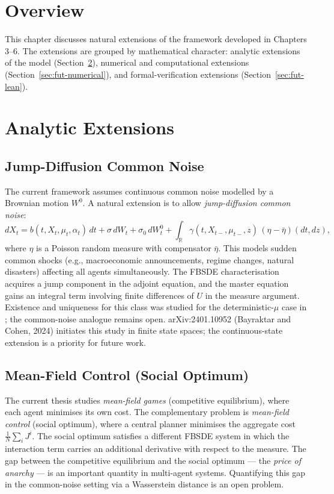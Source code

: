 
\section{Overview}

This chapter discusses natural extensions of the framework developed in
Chapters 3--6. The extensions are grouped by mathematical character:
analytic extensions of the model (Section~\ref{sec:fut-analytic}),
numerical and computational extensions (Section~\ref{sec:fut-numerical}),
and formal-verification extensions (Section~\ref{sec:fut-lean}).

\section{Analytic Extensions}
\label{sec:fut-analytic}

\subsection{Jump-Diffusion Common Noise}

The current framework assumes continuous common noise modelled by a Brownian motion
$W^0$. A natural extension is to allow \emph{jump-diffusion common noise}:
\[
    dX_t = b(t, X_t, \mu_t, \alpha_t)\, dt + \sigma\, dW_t + \sigma_0\, dW_t^0
    + \int_{\mathbb{R}} \gamma(t, X_{t-}, \mu_{t-}, z)\, (\eta - \bar\eta)(dt, dz),
\]
where $\eta$ is a Poisson random measure with compensator $\bar\eta$. This models
sudden common shocks (e.g., macroeconomic announcements, regime changes, natural
disasters) affecting all agents simultaneously. The FBSDE characterisation
acquires a jump component in the adjoint equation, and the master equation gains
an integral term involving finite differences of $U$ in the measure argument.
Existence and uniqueness for this class was studied for the deterministic-$\mu$
case in \citep{carmona2013probabilistic}; the common-noise analogue remains open.
arXiv:2401.10952 (Bayraktar and Cohen, 2024) initiates this study in finite
state spaces; the continuous-state extension is a priority for future work.

\subsection{Mean-Field Control (Social Optimum)}

The current thesis studies \emph{mean-field games} (competitive equilibrium), where
each agent minimises its own cost. The complementary problem is \emph{mean-field
control} (social optimum), where a central planner minimises the aggregate cost
$\frac{1}{N}\sum_i J^i$. The social optimum satisfies a different FBSDE system in
which the interaction term carries an additional derivative with respect to the
measure. The gap between the competitive equilibrium and the social optimum --- the
\emph{price of anarchy} --- is an important quantity in multi-agent systems.
Quantifying this gap in the common-noise setting via a Wasserstein distance is
an open problem.

